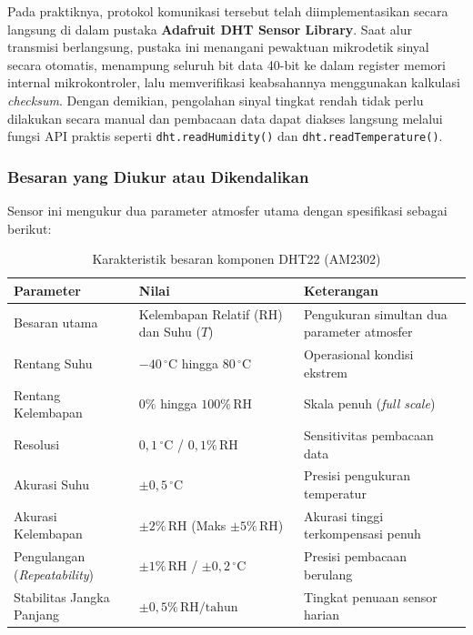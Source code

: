 Pada praktiknya, protokol komunikasi tersebut telah diimplementasikan secara langsung di dalam pustaka \textbf{Adafruit DHT Sensor Library}. Saat alur transmisi berlangsung, pustaka ini menangani pewaktuan mikrodetik sinyal secara otomatis, menampung seluruh bit data 40-bit ke dalam register memori internal mikrokontroler, lalu memverifikasi keabsahannya menggunakan kalkulasi \textit{checksum}. Dengan demikian, pengolahan sinyal tingkat rendah tidak perlu dilakukan secara manual dan pembacaan data dapat diakses langsung melalui fungsi API praktis seperti \texttt{dht.readHumidity()} dan \texttt{dht.readTemperature()}.

\subsubsection{Besaran yang Diukur atau Dikendalikan}
Sensor ini mengukur dua parameter atmosfer utama dengan spesifikasi sebagai berikut:

\begin{table}[H]
	\centering
	\caption{Karakteristik besaran komponen DHT22 (AM2302)}
	\label{tab:dht22_karakteristik_besaran}
	\small
	\begin{tabularx}{\textwidth}{@{}lXX@{}}
		\toprule
		Parameter                            & Nilai                                              & Keterangan                                 \\
		\midrule
		Besaran utama                        & Kelembapan Relatif ($\text{RH}$) dan Suhu ($T$)    & Pengukuran simultan dua parameter atmosfer \\
		Rentang Suhu                         & $-40\,^\circ\text{C}$ hingga $80\,^\circ\text{C}$  & Operasional kondisi ekstrem                \\
		Rentang Kelembapan                   & $0\%$ hingga $100\%\,\text{RH}$                    & Skala penuh (\textit{full scale})          \\
		Resolusi                             & $0{,}1\,^\circ\text{C}$ / $0{,}1\%\,\text{RH}$     & Sensitivitas pembacaan data                \\
		Akurasi Suhu                         & $\pm 0{,}5\,^\circ\text{C}$                        & Presisi pengukuran temperatur              \\
		Akurasi Kelembapan                   & $\pm 2\%\,\text{RH}$ (Maks $\pm 5\%\,\text{RH}$)   & Akurasi tinggi terkompensasi penuh         \\
		Pengulangan (\textit{Repeatability}) & $\pm 1\%\,\text{RH}$ / $\pm 0{,}2\,^\circ\text{C}$ & Presisi pembacaan berulang                 \\
		Stabilitas Jangka Panjang            & $\pm 0{,}5\%\,\text{RH/tahun}$                     & Tingkat penuaan sensor harian              \\
		\bottomrule
	\end{tabularx}
\end{table}

